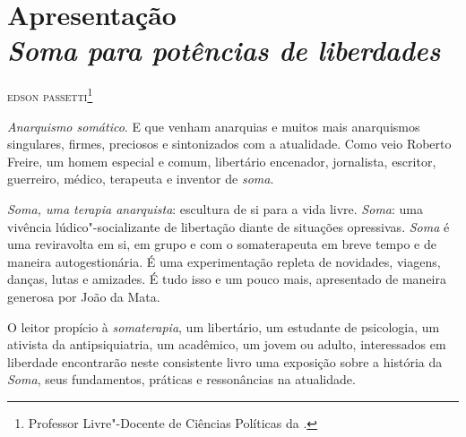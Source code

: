 


\chapter*{Apresentação\\ \emph{Soma para potências de liberdades}}

\begin{flushright}
\textsc{edson passetti}\footnote[*]{Professor Livre"-Docente de Ciências Políticas da .}
\end{flushright}

\emph{Anarquismo somático}. E que venham anarquias e muitos mais
anarquismos singulares, firmes, preciosos e sintonizados com a
atualidade. Como veio Roberto Freire, um homem especial e comum,
libertário encenador, jornalista, escritor, guerreiro, médico, terapeuta
e inventor de \emph{soma}.

\emph{Soma, uma terapia anarquista}: escultura de si para a vida livre.
\emph{Soma}: uma vivência lúdico"-socializante de libertação diante de
situações opressivas. \emph{Soma} é uma reviravolta em si, em grupo e
com o somaterapeuta em breve tempo e de maneira autogestionária. É uma
experimentação repleta de novidades, viagens, danças, lutas e amizades.
É tudo isso e um pouco mais, apresentado de maneira generosa por João da
Mata.

O leitor propício à \emph{somaterapia}, um libertário, um estudante de
psicologia, um ativista da antipsiquiatria, um acadêmico, um jovem ou
adulto, interessados em liberdade encontrarão neste consistente livro
uma exposição sobre a história da \emph{Soma}, seus fundamentos,
práticas e ressonâncias na atualidade.

